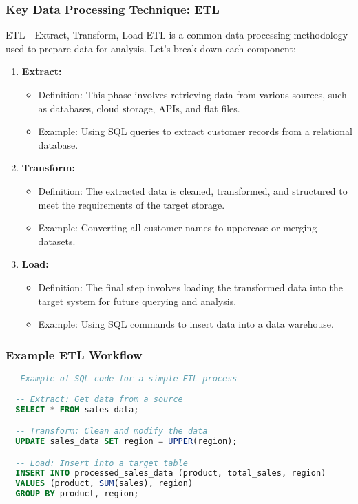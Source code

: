 \documentclass[aspectratio=169]{beamer}
\begin{document}
\begin{frame}
  \frametitle{Key Data Processing Technique: ETL}
  \begin{block}{ETL - Extract, Transform, Load}
    ETL is a common data processing methodology used to prepare data for analysis. Let's break down each component:
  \end{block}
  \begin{enumerate}
    \item \textbf{Extract:} 
        \begin{itemize}
          \item Definition: This phase involves retrieving data from various sources, such as databases, cloud storage, APIs, and flat files.
          \item Example: Using SQL queries to extract customer records from a relational database.
        \end{itemize}
    
    \item \textbf{Transform:} 
        \begin{itemize}
          \item Definition: The extracted data is cleaned, transformed, and structured to meet the requirements of the target storage.
          \item Example: Converting all customer names to uppercase or merging datasets.
        \end{itemize}
    
    \item \textbf{Load:} 
        \begin{itemize}
          \item Definition: The final step involves loading the transformed data into the target system for future querying and analysis.
          \item Example: Using SQL commands to insert data into a data warehouse.
        \end{itemize}
  \end{enumerate}
\end{frame}

\begin{frame}[fragile]
  \frametitle{Example ETL Workflow}
  \begin{lstlisting}[language=SQL]
  -- Example of SQL code for a simple ETL process
  
  -- Extract: Get data from a source
  SELECT * FROM sales_data;

  -- Transform: Clean and modify the data
  UPDATE sales_data SET region = UPPER(region);

  -- Load: Insert into a target table
  INSERT INTO processed_sales_data (product, total_sales, region)
  VALUES (product, SUM(sales), region)
  GROUP BY product, region;
  \end{lstlisting}
\end{frame}
\end{document}
